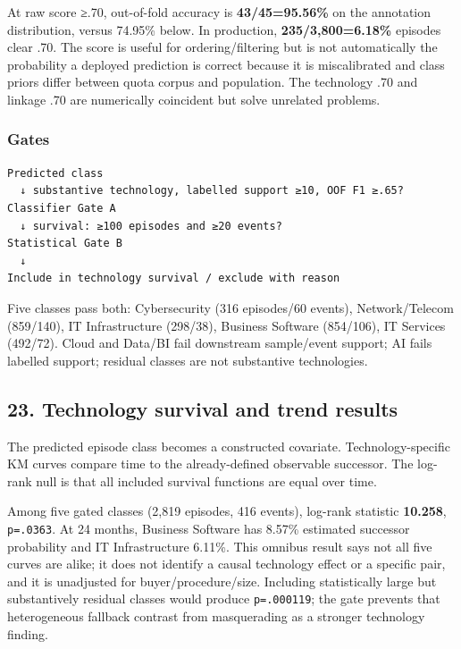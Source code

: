 At raw score ≥.70, out-of-fold accuracy is \textbf{43/45=95.56\%} on the
annotation distribution, versus 74.95\% below. In production,
\textbf{235/3,800=6.18\%} episodes clear .70. The score is useful for
ordering/filtering but is not automatically the probability a deployed
prediction is correct because it is miscalibrated and class priors
differ between quota corpus and population. The technology .70 and
linkage .70 are numerically coincident but solve unrelated problems.

\subsubsection{Gates}\label{gates}

\begin{verbatim}
Predicted class
  ↓ substantive technology, labelled support ≥10, OOF F1 ≥.65?
Classifier Gate A
  ↓ survival: ≥100 episodes and ≥20 events?
Statistical Gate B
  ↓
Include in technology survival / exclude with reason
\end{verbatim}

Five classes pass both: Cybersecurity (316 episodes/60 events),
Network/Telecom (859/140), IT Infrastructure (298/38), Business Software
(854/106), IT Services (492/72). Cloud and Data/BI fail downstream
sample/event support; AI fails labelled support; residual classes are
not substantive technologies.

\subsection{23. Technology survival and trend
results}\label{23-technology-survival-and-trend-results}

The predicted episode class becomes a constructed covariate.
Technology-specific KM curves compare time to the already-defined
observable successor. The log-rank null is that all included survival
functions are equal over time.

Among five gated classes (2,819 episodes, 416 events), log-rank
statistic \textbf{10.258}, \texttt{p=.0363}. At 24 months, Business
Software has 8.57\% estimated successor probability and IT
Infrastructure 6.11\%. This omnibus result says not all five curves are
alike; it does not identify a causal technology effect or a specific
pair, and it is unadjusted for buyer/procedure/size. Including
statistically large but substantively residual classes would produce
\texttt{p=.000119}; the gate prevents that heterogeneous fallback
contrast from masquerading as a stronger technology finding.

